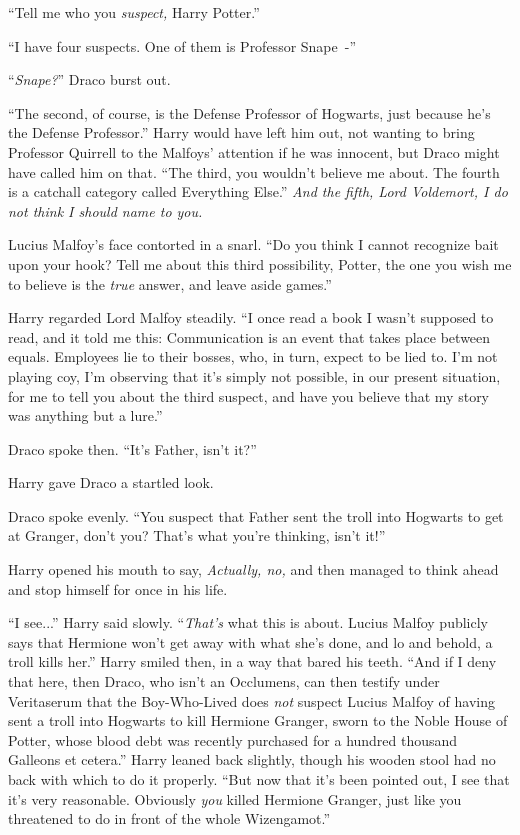 ``Tell me who you \emph{suspect,} Harry Potter.''

``I have four suspects. One of them is Professor Snape~-''

``\emph{Snape?}'' Draco burst out.

``The second, of course, is the Defense Professor of Hogwarts, just because he's the Defense Professor.'' Harry would have left him out, not wanting to bring Professor Quirrell to the Malfoys' attention if he was innocent, but Draco might have called him on that. ``The third, you wouldn't believe me about. The fourth is a catchall category called Everything Else.'' \emph{And the fifth, Lord Voldemort, I do not think I should name to you.}

Lucius Malfoy's face contorted in a snarl. ``Do you think I cannot recognize bait upon your hook? Tell me about this third possibility, Potter, the one you wish me to believe is the \emph{true} answer, and leave aside games.''

Harry regarded Lord Malfoy steadily. ``I once read a book I wasn't supposed to read, and it told me this: Communication is an event that takes place between equals. Employees lie to their bosses, who, in turn, expect to be lied to. I'm not playing coy, I'm observing that it's simply not possible, in our present situation, for me to tell you about the third suspect, and have you believe that my story was anything but a lure.''

Draco spoke then. ``It's Father, isn't it?''

Harry gave Draco a startled look.

Draco spoke evenly. ``You suspect that Father sent the troll into Hogwarts to get at Granger, don't you? That's what you're thinking, isn't it!''

Harry opened his mouth to say, \emph{Actually, no,} and then managed to think ahead and stop himself for once in his life.

``I see...'' Harry said slowly. ``\emph{That's} what this is about. Lucius Malfoy publicly says that Hermione won't get away with what she's done, and lo and behold, a troll kills her.'' Harry smiled then, in a way that bared his teeth. ``And if I deny that here, then Draco, who isn't an Occlumens, can then testify under Veritaserum that the Boy-Who-Lived does \emph{not} suspect Lucius Malfoy of having sent a troll into Hogwarts to kill Hermione Granger, sworn to the Noble House of Potter, whose blood debt was recently purchased for a hundred thousand Galleons et cetera.'' Harry leaned back slightly, though his wooden stool had no back with which to do it properly. ``But now that it's been pointed out, I see that it's very reasonable. Obviously \emph{you} killed Hermione Granger, just like you threatened to do in front of the whole Wizengamot.''

